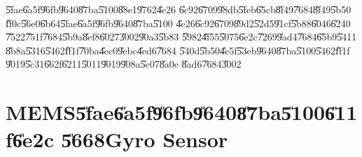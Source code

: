 \U{5fae}\U{6a5f}\U{96fb}\U{9640}\U{87ba}\U{5100}\U{88e1}\U{9762}\U{4e26}%
\U{6c92}\U{6709}\U{98db}\U{5feb}\U{65cb}\U{8f49}\U{7684}\U{8f49}\U{5b50}%
\U{ff0c}\U{56e0}\U{6b64}\U{5fae}\U{6a5f}\U{96fb}\U{9640}\U{87ba}\U{5100}%
\U{4e26}\U{6c92}\U{6709}\U{89d2}\U{52d5}\U{91cf}\U{5b88}\U{6046}\U{6240}%
\U{7522}\U{751f}\U{7684}\U{5b9a}\U{8ef8}\U{6027}\U{3002}\U{90a3}\U{5b83}%
\U{5982}\U{4f55}\U{5075}\U{6e2c}\U{7269}\U{9ad4}\U{7684}\U{65b9}\U{5411}%
\U{8b8a}\U{5316}\U{5462}\U{ff1f}\U{70ba}\U{4ec0}\U{9ebc}\U{4ed6}\U{7684}%
\U{540d}\U{5b50}\U{4e5f}\U{53eb}\U{9640}\U{87ba}\U{5100}\U{5462}\U{ff1f}%
\U{9019}\U{5c31}\U{662f}\U{6211}\U{5011}\U{9019}\U{908a}\U{5c07}\U{8a0e}%
\U{8ad6}\U{7684}\U{3002}

\section{MEMS\U{5fae}\U{6a5f}\U{96fb}\U{9640}\U{87ba}\U{5100}\U{611f}\U{6e2c}%
\U{5668}Gyro Sensor}

